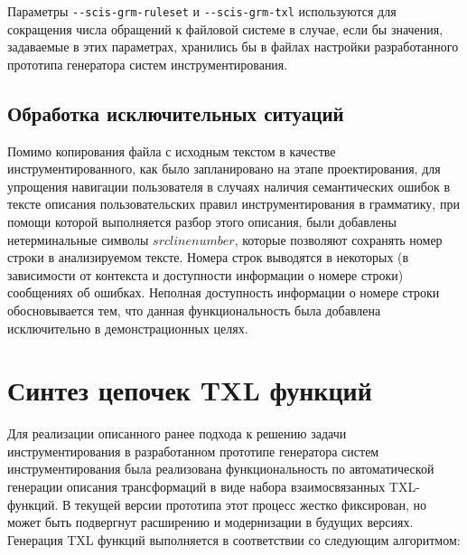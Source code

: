 Параметры \lstinline{--scis-grm-ruleset} и \lstinline{--scis-grm-txl} используются для сокращения числа обращений к файловой системе в случае, если бы значения, задаваемые в этих параметрах, хранились бы в файлах настройки разработанного прототипа генератора систем инструментирования.

\subsection{Обработка исключительных ситуаций}

Помимо копирования файла с исходным текстом в качестве инструментированного, как было запланировано на этапе проектирования, для упрощения навигации пользователя в случаях наличия семантических ошибок в тексте описания пользовательских правил инструментирования в грамматику, при помощи которой выполняется разбор этого описания, были добавлены нетерминальные символы $srclinenumber$, которые позволяют сохранять номер строки в анализируемом тексте.
Номера строк выводятся в некоторых (в зависимости от контекста и доступности информации о номере строки) сообщениях об ошибках.
Неполная доступность информации о номере строки обосновывается тем, что данная функциональность была добавлена исключительно в демонстрационных целях.

\section{Синтез цепочек TXL функций}

Для реализации описанного ранее подхода к решению задачи инструментирования в разработанном прототипе генератора систем инструментирования была реализована функциональность по автоматической генерации описания трансформаций в виде набора взаимосвязанных TXL-функций.
В текущей версии прототипа этот процесс жестко фиксирован, но может быть подвергнут расширению и модернизации в будущих версиях.
Генерация TXL функций выполняется в соответствии со следующим алгоритмом:

